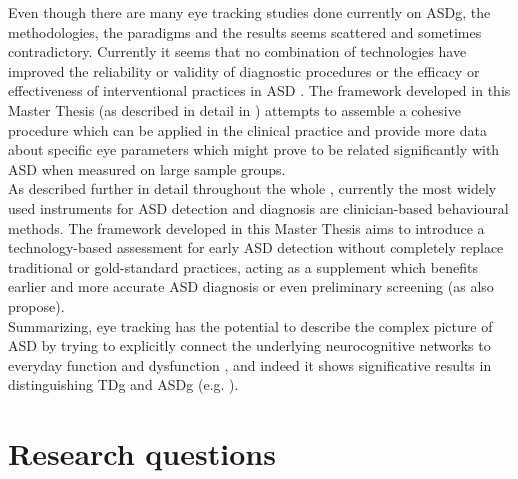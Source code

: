 Even though there are many eye tracking studies done currently on ASDg, the methodologies, the paradigms and the results seems scattered and sometimes contradictory. Currently  it seems that no combination of technologies have improved the reliability or validity of diagnostic procedures or the efficacy or effectiveness of interventional practices in ASD \cite{bolte2016detection}. The framework developed in this Master Thesis (as described in detail in ) attempts to assemble a cohesive procedure which can be applied in the clinical practice and provide more data about specific eye parameters which might prove to be related significantly with ASD when measured on large sample groups.\\
As described further in detail throughout the whole , currently the most widely used instruments for ASD detection and diagnosis are clinician-based behavioural methods. The framework developed in this Master Thesis aims to introduce a technology-based assessment for early ASD detection without completely replace traditional or gold-standard practices, acting as a supplement which benefits earlier and more accurate ASD diagnosis or even preliminary screening (as \citealp{liu2015machinelearning} also propose).\\
Summarizing, eye tracking has the potential to describe the complex picture of ASD by trying to explicitly connect the underlying neurocognitive networks to everyday function and dysfunction \citep{falck-ytter2013eyetrackingASD}, and indeed it shows significative results in distinguishing TDg and ASDg (e.g.  \citealp{boraston2007eyetrackingASD,papagiannopoulou2014review,bolte2016detection,johnson2016review}).






\section{Research questions}
\label{sec:researchquestions}

